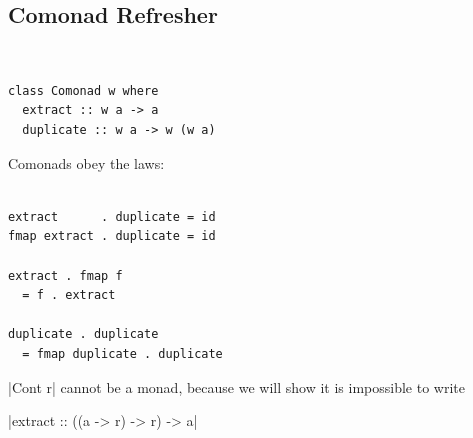 \documentclass{beamer}
\begin{document}
\subsection{Comonad Refresher}
\begin{frame}{\insertsectionhead\ \textemdash\
    \insertsubsectionhead}
\begin{lstlisting}
class Comonad w where
  extract :: w a -> a
  duplicate :: w a -> w (w a)
\end{lstlisting}

\framebreak

Comonads obey the laws:\\~\\

\begin{lstlisting}
extract      . duplicate = id
fmap extract . duplicate = id

extract . fmap f
  = f . extract

duplicate . duplicate
  = fmap duplicate . duplicate
\end{lstlisting}

\framebreak

|Cont r| cannot be a monad, because we will show it is impossible to write

\begin{center}
|extract :: ((a -> r) -> r) -> a|
\end{center}

\end{frame}
\end{document}
